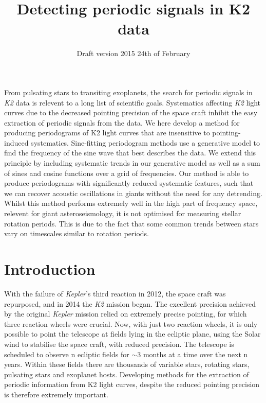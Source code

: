 \documentclass[useAMS, usenatbib]{aastex}
\title{Detecting periodic signals in K2 data}
\begin{document}
\date{Draft version 2015 24th of February}
\maketitle

From pulsating stars to transiting exoplanets, the search for periodic signals
in {\it K2} data is relevent to a long list of scientific goals.
Systematics affecting {\it K2} light curves due to the decreased pointing
precision of the space craft inhibit the easy extraction of periodic signals
from the data.
We here develop a method for producing periodograms of K2 light curves that
are insensitive to pointing-induced systematics.
Sine-fitting periodogram methods use a generative model to find the frequency
of the sine wave that best describes the data.
We extend this principle by including systematic trends in our generative
model as well as a sum of sines and cosine functions over a grid of
frequencies.
Our method is able to produce periodograms with significantly reduced
systematic features, such that we can recover acoustic oscillations in giants
without the need for any detrending.
Whilst this method performs extremely well in the high part of frequency space,
relevent for giant asteroseismology, it is not optimised for measuring stellar
rotation periods.
This is due to the fact that some common trends between stars vary on
timescales similar to rotation periods.

\section{Introduction}
\label{Introduction}

With the failure of {\it Kepler}'s third reaction in 2012, the space craft was
repurposed, and in 2014 the {\it K2} mission began.
The excellent precision achieved by the original {\it Kepler} mission relied on extremely precise pointing, for which three reaction wheels were crucial.
Now, with just two reaction wheels, it is only possible to point the telescope
at fields lying in the ecliptic plane, using the Solar wind to stabilise
the space craft, with reduced precision.
The telescope is scheduled to observe n ecliptic fields for $\sim$3 months at a
time over the next n years.
Within these fields there are thousands of variable stars, rotating stars,
pulsating stars and exoplanet hosts.
Developing methods for the extraction of periodic information from K2 light
curves, despite the reduced pointing precision is therefore extremely
important.
\end{document}
